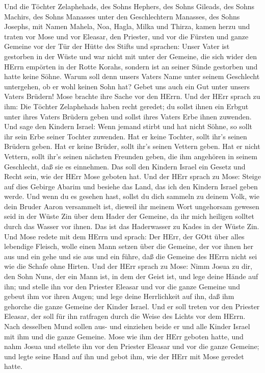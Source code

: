  Und die Töchter Zelaphehads, des Sohns Hephers, des Sohns
Gileads, des Sohns Machirs, des Sohns Manasses unter den Geschlechtern
Manasses, des Sohns Josephs, mit Namen Mahela, Noa, Hagla, Milka und
Thirza, kamen herzu  und traten vor Mose und vor Eleasar,
den Priester, und vor die Fürsten und ganze Gemeine vor der Tür der
Hütte des Stifts und sprachen:  Unser Vater ist gestorben in
der Wüste und war nicht mit unter der Gemeine, die sich wider den HErrn
empörten in der Rotte Korahs, sondern ist an seiner Sünde gestorben und
hatte keine Söhne.  Warum soll denn unsers Vaters Name unter
seinem Geschlecht untergehen, ob er wohl keinen Sohn hat? Gebet uns auch
ein Gut unter unsers Vaters Brüdern!  Mose brachte ihre
Sache vor den HErrn.  Und der HErr sprach zu ihm:
 Die Töchter Zelaphehads haben recht geredet; du sollst
ihnen ein Erbgut unter ihres Vaters Brüdern geben und sollst ihres
Vaters Erbe ihnen zuwenden.  Und sage den Kindern Israel:
Wenn jemand stirbt und hat nicht Söhne, so sollt ihr sein Erbe seiner
Tochter zuwenden.  Hat er keine Tochter, sollt ihr's seinen
Brüdern geben.  Hat er keine Brüder, sollt ihr's seinen
Vettern geben.  Hat er nicht Vettern, sollt ihr's seinen
nächsten Freunden geben, die ihm angehören in seinem Geschlecht, daß sie
es einnehmen. Das soll den Kindern Israel ein Gesetz und Recht sein, wie
der HErr Mose geboten hat.  Und der HErr sprach zu Mose:
Steige auf dies Gebirge Abarim und besiehe das Land, das ich den Kindern
Israel geben werde.  Und wenn du es gesehen hast, sollst du
dich sammeln zu deinem Volk, wie dein Bruder Aaron versammelt ist,
 dieweil ihr meinem Wort ungehorsam gewesen seid in der
Wüste Zin über dem Hader der Gemeine, da ihr mich heiligen solltet durch
das Wasser vor ihnen. Das ist das Haderwasser zu Kades in der Wüste Zin.
 Und Mose redete mit dem HErrn und sprach: 
Der HErr, der GOtt über alles lebendige Fleisch, wolle einen Mann setzen
über die Gemeine,  der vor ihnen her aus und ein gehe und
sie aus und ein führe, daß die Gemeine des HErrn nicht sei wie die
Schafe ohne Hirten.  Und der HErr sprach zu Mose: Nimm
Josua zu dir, den Sohn Nuns, der ein Mann ist, in dem der Geist ist, und
lege deine Hände auf ihn;  und stelle ihn vor den Priester
Eleasar und vor die ganze Gemeine und gebeut ihm vor ihren Augen;
 und lege deine Herrlichkeit auf ihn, daß ihm gehorche die
ganze Gemeine der Kinder Israel.  Und er soll treten vor
den Priester Eleasar, der soll für ihn ratfragen durch die Weise des
Lichts vor dem HErrn. Nach desselben Mund sollen aus- und einziehen
beide er und alle Kinder Israel mit ihm und die ganze Gemeine.
 Mose wie ihm der HErr geboten hatte, und nahm Josua und
stellete ihn vor den Priester Eleasar und vor die ganze Gemeine;
 und legte seine Hand auf ihn und gebot ihm, wie der HErr
mit Mose geredet hatte.

